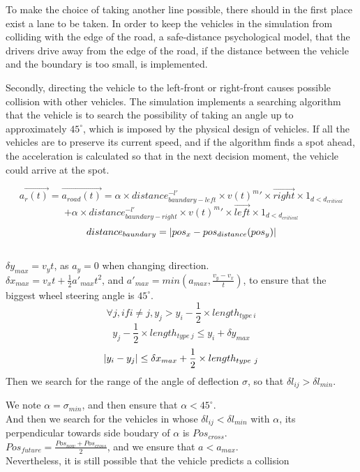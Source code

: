 \documentclass{mcmthesis}
\begin{document}
To make the choice of taking another line possible, there should in the first place exist a lane to be taken. In order to keep the vehicles in the simulation from colliding with the edge of the road, a safe-distance psychological model, that the drivers drive away from the edge of the road, if the distance between the vehicle and the boundary is too small, is implemented. 

Secondly, directing the vehicle to the left-front or right-front causes possible collision with other vehicles. The simulation implements a searching algorithm that the vehicle is to search the possibility of taking an angle up to approximately $45^{\circ}$, which is imposed by the physical design of vehicles. If all the vehicles are to preserve its current speed, and if the algorithm finds a spot ahead, the acceleration is calculated so that in the next decision moment, the vehicle could arrive at the spot.

$$\overrightarrow{a_r(t)}=\overrightarrow{a_{road}(t)}=\alpha \times distance_{baundary-left}^{-l'} \times v(t)^m'\times \overrightarrow{right} \times 1_{d<d_{critical}}$$
$$+\alpha \times distance_{baundary-right}^{-l'} \times v(t)^m'\times \overrightarrow{left} \times 1_{d<d_{critical}}$$
$$distance_{baundary}=\arrowvert pos_x-pos_{distance}(pos_y) \arrowvert$$\\
 $\delta y_{max}=v_yt$, as $a_y=0$ when changing direction.\\
$\delta x_{max}=v_xt+\frac{1}{2}a'_{max}t^2$, and $a'_{max}=min(a_{max},\frac{v_y-v_x}{t})$, to ensure that the biggest wheel steering angle is $45^{\circ}$.\\
$$\forall j, if i \ne j, y_j>y_i-\frac{1}{2} \times length_{type\ i}$$
$$y_j-\frac{1}{2} \times length_{type\ j} \le y_i+\delta y_{max}$$
$$\arrowvert y_i-y_j \arrowvert \le \delta x_{max}+ \frac{1}{2} \times length_{type\ j}$$
Then we search for the range of the angle of deflection $\sigma$, so that $\delta l_{ij}>\delta l_{min}$.

We note $\alpha=\sigma_{min}$, and then ensure that $\alpha<45^{\circ}$.\\
And then we search for the vehicles in  whose $\delta l_{ij}<\delta l_{min}$ with $\alpha$, its perpendicular towards side boudary of $\alpha$ is $Pos_{cross}$.\\

$Pos_{future}=\frac{Pos_{now}+Pos_{cross}}{2}$, and we ensure that $a<a_{max}$.\\

Nevertheless, it is still possible that the vehicle predicts a collision 
\end{document}
